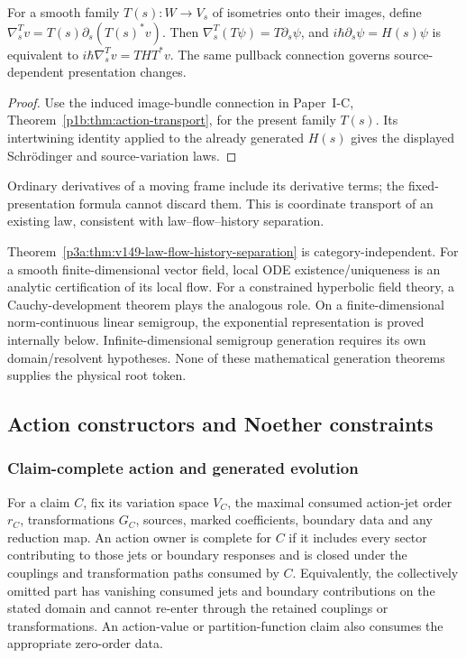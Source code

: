 \documentclass[12pt,a4paper]{article}
\begin{document}
\begin{corollary}
\label{p3a:cor:v204-moving-presentation}
For a smooth family $T(s):W\to V_s$ of isometries onto their images, define
$\nabla_s^T v=T(s)\partial_s(T(s)^*v)$. Then
$\nabla_s^T(T\psi)=T\partial_s\psi$, and
$i\hbar\partial_s\psi=H(s)\psi$ is equivalent to
$i\hbar\nabla_s^T v=THT^*v$. The same pullback connection governs
source-dependent presentation changes.
\end{corollary}
\begin{proof}
Use the induced image-bundle connection in Paper~I-C,
Theorem~\ref{p1b:thm:action-transport}, for the present family $T(s)$.
Its intertwining identity applied to the already generated $H(s)$ gives
the displayed Schr\"odinger and source-variation laws.
\end{proof}
Ordinary derivatives of a moving frame include its derivative terms; the
fixed-presentation formula cannot discard them. This is coordinate transport
of an existing law, consistent with law--flow--history separation.

\begin{remark}
\label{p3a:rem:v149-generator-flow-families}
Theorem~\ref{p3a:thm:v149-law-flow-history-separation} is category-independent.
For a smooth finite-dimensional vector field, local ODE existence/uniqueness
is an analytic certification of its local flow.  For a constrained
hyperbolic field theory, a Cauchy-development theorem plays the analogous
role.  On a finite-dimensional norm-continuous linear semigroup, the
exponential representation is proved internally below.  Infinite-dimensional
semigroup generation requires its own domain/resolvent hypotheses.  None of
these mathematical generation theorems supplies the physical root token.
\end{remark}



\subsection{Action constructors and Noether constraints}
\subsubsection{Claim-complete action and generated evolution}

\begin{definition}
\label{p3a:def:claim-complete-action-owner}
For a claim \(C\), fix its variation space \(V_C\), the maximal consumed
action-jet order \(r_C\), transformations \(G_C\), sources, marked
coefficients, boundary data and any reduction map.  An action owner is
complete for \(C\) if it includes every sector contributing to those
jets or boundary responses and is closed under the couplings and
transformation paths consumed by \(C\).  Equivalently, the collectively
omitted part has vanishing consumed jets and boundary contributions
on the stated domain and cannot re-enter through the retained
couplings or transformations.  An action-value or partition-function
claim also consumes the appropriate zero-order data.
\end{definition}
\end{document}
